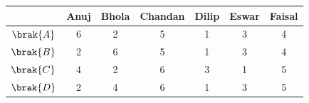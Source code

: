 \begin{tabular}[12pt]{|c|c|c|c|c|c|c|}
    \hline
    \textbf{} & Anuj & Bhola & Chandan & Dilip & Eswar & Faisal\\ 
    \hline
    $\brak{A}$ & 6 & 2 & 5 & 1 & 3 & 4\\
    \hline 
    $\brak{B}$ & 2 & 6 & 5 & 1 & 3 & 4\\
    \hline
    $\brak{C}$ & 4 & 2 & 6 & 3 & 1 & 5\\
    \hline
    $\brak{D}$ & 2 & 4 & 6 & 1 & 3 & 5\\
    \hline
    
   
     
    \end{tabular}
